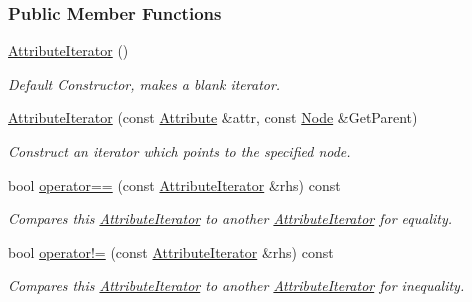 \subsubsection*{Public Member Functions}
\begin{DoxyCompactItemize}
\item 
\hypertarget{classphys_1_1xml_1_1AttributeIterator_af2804899f79a9982466acf69b5dd0cab}{
\hyperlink{classphys_1_1xml_1_1AttributeIterator_af2804899f79a9982466acf69b5dd0cab}{AttributeIterator} ()}
\label{classphys_1_1xml_1_1AttributeIterator_af2804899f79a9982466acf69b5dd0cab}

\begin{DoxyCompactList}\small\item\em Default Constructor, makes a blank iterator. \item\end{DoxyCompactList}\item 
\hyperlink{classphys_1_1xml_1_1AttributeIterator_a175551035493cea0c9a56e36adcbac23}{AttributeIterator} (const \hyperlink{classphys_1_1xml_1_1Attribute}{Attribute} \&attr, const \hyperlink{classphys_1_1xml_1_1Node}{Node} \&GetParent)
\begin{DoxyCompactList}\small\item\em Construct an iterator which points to the specified node. \item\end{DoxyCompactList}\item 
bool \hyperlink{classphys_1_1xml_1_1AttributeIterator_a0eb472612438f4541ad27390ce74f6f4}{operator==} (const \hyperlink{classphys_1_1xml_1_1AttributeIterator}{AttributeIterator} \&rhs) const 
\begin{DoxyCompactList}\small\item\em Compares this \hyperlink{classphys_1_1xml_1_1AttributeIterator}{AttributeIterator} to another \hyperlink{classphys_1_1xml_1_1AttributeIterator}{AttributeIterator} for equality. \item\end{DoxyCompactList}\item 
bool \hyperlink{classphys_1_1xml_1_1AttributeIterator_a600802085aa88e41bcb2611f8044af59}{operator!=} (const \hyperlink{classphys_1_1xml_1_1AttributeIterator}{AttributeIterator} \&rhs) const 
\begin{DoxyCompactList}\small\item\em Compares this \hyperlink{classphys_1_1xml_1_1AttributeIterator}{AttributeIterator} to another \hyperlink{classphys_1_1xml_1_1AttributeIterator}{AttributeIterator} for inequality. \item\end{DoxyCompactList}\item 

\end{DoxyCompactItemize}
